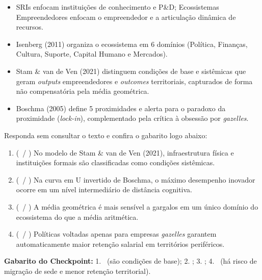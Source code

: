 \begin{boxResumo}
\begin{itemize}[leftmargin=1.4em, itemsep=2pt]
  \item SRIs enfocam instituições de conhecimento e P\&D; Ecossistemas Empreendedores enfocam o empreendedor e a articulação dinâmica de recursos.
  \item Isenberg (2011) organiza o ecossistema em 6 domínios (Política, Finanças, Cultura, Suporte, Capital Humano e Mercados).
  \item Stam \& van de Ven (2021) distinguem condições de base e sistêmicas que geram \textit{outputs} empreendedores e \textit{outcomes} territoriais, capturados de forma não compensatória pela média geométrica.
  \item Boschma (2005) define 5 proximidades e alerta para o paradoxo da proximidade (\textit{lock-in}), complementado pela crítica à obsessão por \textit{gazelles}.
\end{itemize}
\end{boxResumo}

\begin{boxTeste}
Responda sem consultar o texto e confira o gabarito logo abaixo:
\begin{enumerate}[leftmargin=1.4em, itemsep=3pt]
  \item (\V\ / \F) No modelo de Stam \& van de Ven (2021), infraestrutura física e instituições formais são classificadas como condições sistêmicas.
  \item (\V\ / \F) Na curva em U invertido de Boschma, o máximo desempenho inovador ocorre em um nível intermediário de distância cognitiva.
  \item (\V\ / \F) A média geométrica é mais sensível a gargalos em um único domínio do ecossistema do que a média aritmética.
  \item (\V\ / \F) Políticas voltadas apenas para empresas \textit{gazelles} garantem automaticamente maior retenção salarial em territórios periféricos.
\end{enumerate}
\vspace{4pt}
\textbf{Gabarito do Checkpoint:} 1. \F\ (são condições de base); 2. \V; 3. \V; 4. \F\ (há risco de migração de sede e menor retenção territorial).
\end{boxTeste}
